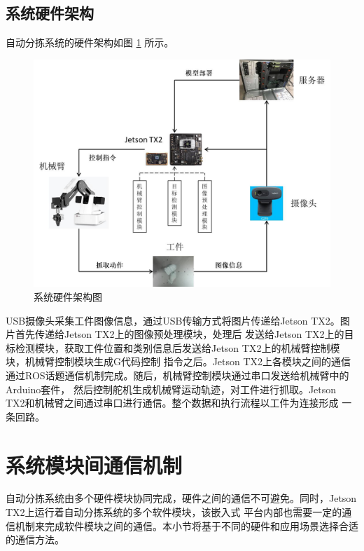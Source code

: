 \subsection{系统硬件架构}

自动分拣系统的硬件架构如图 \ref{fig:hardware_construct} 所示。

\begin{figure}
    \centering
    \includegraphics[width=\textwidth]{pic/chap2/hardware_construct.jpg}
    \caption{系统硬件架构图}
    \label{fig:hardware_construct}
\end{figure}

USB摄像头采集工件图像信息，通过USB传输方式将图片传递给Jetson TX2。图片首先传递给Jetson TX2上的图像预处理模块，处理后
发送给Jetson TX2上的目标检测模块，获取工件位置和类别信息后发送给Jetson TX2上的机械臂控制模块，机械臂控制模块生成G代码控制
指令之后。Jetson TX2上各模块之间的通信通过ROS话题通信机制完成。随后，机械臂控制模块通过串口发送给机械臂中的Arduino套件，
然后控制舵机生成机械臂运动轨迹，对工件进行抓取。Jetson TX2和机械臂之间通过串口进行通信。整个数据和执行流程以工件为连接形成
一条回路。

\section{系统模块间通信机制}

自动分拣系统由多个硬件模块协同完成，硬件之间的通信不可避免。同时，Jetson TX2上运行着自动分拣系统的多个软件模块，该嵌入式
平台内部也需要一定的通信机制来完成软件模块之间的通信。本小节将基于不同的硬件和应用场景选择合适的通信方法。

